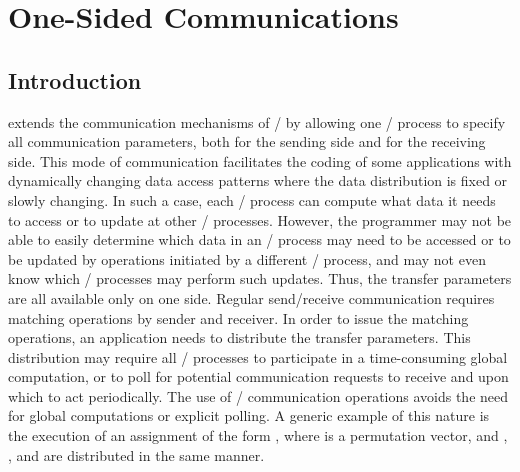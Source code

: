 

\chapter{One-Sided Communications}
\label{chap:one-side-2}
\label{sec:one-side-2}

\section{Introduction}

\mpitermdefni{(\RMA/)}
extends the communication mechanisms of \MPI/ by
allowing one \mpi/ process to specify all communication parameters, both for
the sending side and for the receiving side.
This mode of communication facilitates the coding of some applications
with dynamically changing data access patterns
where the data distribution is fixed or slowly changing.  
In such a case,
each \mpi/ process can compute what data it needs to access or 
to update at
other \mpi/ processes.  
However, the
programmer may not be able to easily determine which data in an \mpi/ process
may need to be accessed or to be updated by operations initiated by a
different \mpi/ process, and may not even know which \mpi/ processes may perform
such updates.
Thus, the transfer parameters are all available only on one side.
Regular send/receive communication requires matching operations by
sender and receiver.
In order to issue the matching operations, an application needs to
distribute the transfer parameters. 
This distribution may
require all \mpi/ processes to participate in a time-consuming global
computation,
or to poll for potential communication requests to
receive and upon which to act periodically.
The use of \RMA/ communication operations avoids the need for
global computations or explicit polling.
A generic example of this nature is the execution of an assignment of
the form
, where  is a permutation vector, and ,
, and  are distributed
in the same manner.  


